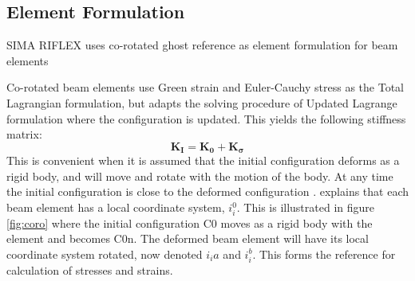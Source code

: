 \subsection{Element Formulation}
\label{sec:ghost}
SIMA RIFLEX uses co-rotated ghost reference as element formulation for beam elements

Co-rotated beam elements use Green strain and Euler-Cauchy stress as the Total Lagrangian formulation, but adapts the solving procedure of Updated Lagrange formulation where the configuration is updated. This yields the following stiffness matrix:
\begin{equation}
    \boldsymbol{K_I}= \boldsymbol{K_0} + \boldsymbol{K_\sigma}
\end{equation}
This is convenient when it is assumed that the initial configuration deforms as a rigid body, and will move and rotate with the motion of the body. At any time the initial configuration is close to the deformed configuration \cite{sintef2017}. \cite{Mathisen1990} explains that each beam element has a local coordinate system, $i_i^0$. This is illustrated in figure \ref{fig:coro} where the initial configuration C0 moves as a rigid body with the element and becomes C0n. The deformed beam element will have its local coordinate system rotated, now denoted $i_ia$ and $i_i^b$. This forms the reference for calculation of stresses and strains. 

